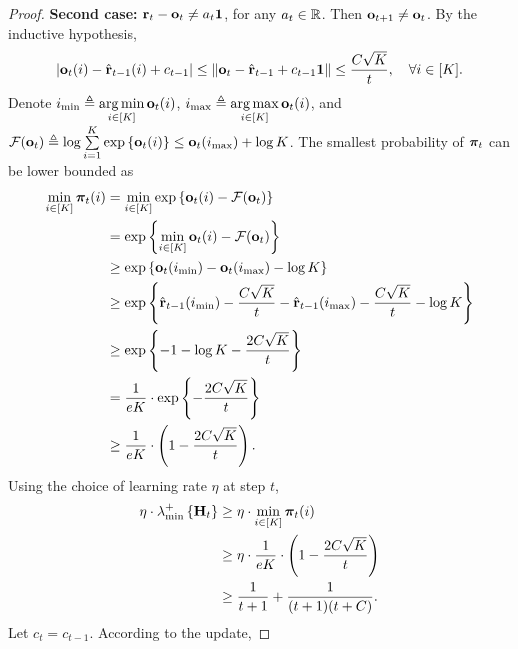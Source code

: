 \begin{proof}
\textbf{Second case:} ${\mathbf{r}}_t - {\mathbf{o}}_t \not= a_t {\mathbf{1}}$, for any $a_t \in {\mathbb{R}}$. Then ${\mathbf{o}}_{t+1} \not= {\mathbf{o}}_t$. By the inductive hypothesis,
\begin{equation*}
\begin{split}
    \left| {\mathbf{o}}_{t}(i) - \hat{{\mathbf{r}}}_{t-1}(i) + c_{t-1} \right| \le \left\| {\mathbf{o}}_{t} - \hat{{\mathbf{r}}}_{t-1} + c_{t-1} {\mathbf{1}} \right\| \le \frac{C \sqrt{K}}{t}, \quad \forall i \in [K].
\end{split}
\end{equation*}
Denote $i_{\min} \triangleq \operatorname*{arg\,min}\limits_{i \in [K]}{{\mathbf{o}}_t(i)} $, $i_{\max} \triangleq \operatorname*{arg\,max}\limits_{i \in [K]}{{\mathbf{o}}_t(i)} $, and ${\mathcal{F}}({\mathbf{o}}_t) \triangleq \log{\sum\limits_{i = 1}^K{\exp\left\{ {\mathbf{o}}_t(i) \right\}} } \le {\mathbf{o}}_t(i_{\max}) + \log{K}$. The smallest probability of ${\boldsymbol{\pi}}_t$ can be lower bounded as
\begin{equation*}
\begin{split}
    \min\limits_{i \in [K]}{{\boldsymbol{\pi}}_t(i)} &= \min\limits_{i \in [K]}{ \exp\left\{ {\mathbf{o}}_t(i) - {\mathcal{F}}({\mathbf{o}}_t) \right\} } \\
    &= \exp\left\{ \min\limits_{i \in [K]}{{\mathbf{o}}_t(i)} - {\mathcal{F}}({\mathbf{o}}_t) \right\} \\
    &\ge \exp\left\{ {\mathbf{o}}_t(i_{\min}) - {\mathbf{o}}_t(i_{\max}) - \log{K} \right\} \\
    &\ge \exp\left\{ \hat{{\mathbf{r}}}_{t-1}(i_{\min}) - \frac{C \sqrt{K}}{t} - \hat{{\mathbf{r}}}_{t-1}(i_{\max}) - \frac{C \sqrt{K}}{t} - \log{K} \right\} \\
    &\ge \exp\left\{ -1 - \log{K} - \frac{2 C \sqrt{K}}{t} \right\} \\
    &= \frac{1}{e K} \cdot \exp\left\{ - \frac{2 C \sqrt{K}}{t} \right\} \\
    &\ge \frac{1}{e K} \cdot \left( 1 - \frac{2 C \sqrt{K}}{t} \right).
\end{split}
\end{equation*}
Using the choice of learning rate $\eta$ at step $t$,
\begin{equation*}
\begin{split}
    \eta \cdot \lambda_{\min}^{+}\left\{ {\mathbf{H}}_t \right\} &\ge \eta \cdot \min\limits_{i \in [K]}{{\boldsymbol{\pi}}_t(i)} \\
    &\ge \eta \cdot \frac{1}{e K} \cdot \left( 1 - \frac{2 C \sqrt{K}}{t} \right) \\
    &\ge \frac{1}{t+1} + \frac{1}{(t+1)(t+C)}.
\end{split}
\end{equation*}
Let $c_{t} = c_{t-1}$. According to the update,

\end{proof}
